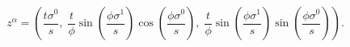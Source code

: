 \begin{equation}
\label{helicoid}
z^{\alpha}=(\frac{t\sigma^0}{s},\;\frac{t}{\phi}\sin (\frac{\phi\sigma^1}{s})\cos (\frac{\phi \sigma^0}{s}),\;\frac{t}{\phi}\sin (\frac{\phi\sigma^1}{s})\sin (\frac{\phi \sigma^0}{s})).
\end{equation}

